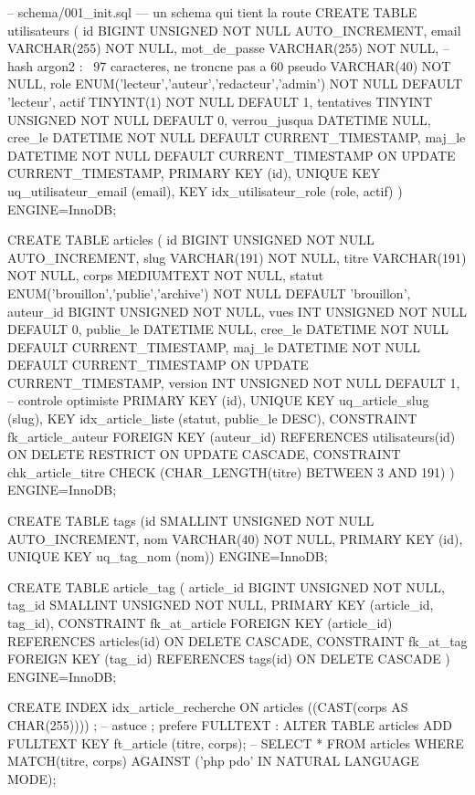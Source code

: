 \begin{codesql}
-- schema/001_init.sql --- un schema qui tient la route
CREATE TABLE utilisateurs (
  id            BIGINT UNSIGNED NOT NULL AUTO_INCREMENT,
  email         VARCHAR(255)    NOT NULL,
  mot_de_passe  VARCHAR(255)    NOT NULL,          -- hash argon2 : ~97 caracteres, ne troncne pas a 60
  pseudo        VARCHAR(40)     NOT NULL,
  role          ENUM('lecteur','auteur','redacteur','admin') NOT NULL DEFAULT 'lecteur',
  actif         TINYINT(1)      NOT NULL DEFAULT 1,
  tentatives    TINYINT UNSIGNED NOT NULL DEFAULT 0,
  verrou_jusqua DATETIME        NULL,
  cree_le       DATETIME        NOT NULL DEFAULT CURRENT_TIMESTAMP,
  maj_le        DATETIME        NOT NULL DEFAULT CURRENT_TIMESTAMP ON UPDATE CURRENT_TIMESTAMP,
  PRIMARY KEY (id),
  UNIQUE KEY uq_utilisateur_email (email),
  KEY idx_utilisateur_role (role, actif)
) ENGINE=InnoDB;

CREATE TABLE articles (
  id          BIGINT UNSIGNED NOT NULL AUTO_INCREMENT,
  slug        VARCHAR(191)    NOT NULL,
  titre       VARCHAR(191)    NOT NULL,
  corps       MEDIUMTEXT      NOT NULL,
  statut      ENUM('brouillon','publie','archive') NOT NULL DEFAULT 'brouillon',
  auteur_id   BIGINT UNSIGNED NOT NULL,
  vues        INT UNSIGNED    NOT NULL DEFAULT 0,
  publie_le   DATETIME        NULL,
  cree_le     DATETIME        NOT NULL DEFAULT CURRENT_TIMESTAMP,
  maj_le      DATETIME        NOT NULL DEFAULT CURRENT_TIMESTAMP ON UPDATE CURRENT_TIMESTAMP,
  version     INT UNSIGNED    NOT NULL DEFAULT 1,      -- controle optimiste
  PRIMARY KEY (id),
  UNIQUE KEY uq_article_slug (slug),
  KEY idx_article_liste (statut, publie_le DESC),
  CONSTRAINT fk_article_auteur FOREIGN KEY (auteur_id) REFERENCES utilisateurs(id)
    ON DELETE RESTRICT ON UPDATE CASCADE,
  CONSTRAINT chk_article_titre CHECK (CHAR_LENGTH(titre) BETWEEN 3 AND 191)
) ENGINE=InnoDB;

CREATE TABLE tags (id SMALLINT UNSIGNED NOT NULL AUTO_INCREMENT, nom VARCHAR(40) NOT NULL,
  PRIMARY KEY (id), UNIQUE KEY uq_tag_nom (nom)) ENGINE=InnoDB;

CREATE TABLE article_tag (
  article_id BIGINT UNSIGNED NOT NULL,
  tag_id     SMALLINT UNSIGNED NOT NULL,
  PRIMARY KEY (article_id, tag_id),
  CONSTRAINT fk_at_article FOREIGN KEY (article_id) REFERENCES articles(id) ON DELETE CASCADE,
  CONSTRAINT fk_at_tag     FOREIGN KEY (tag_id)     REFERENCES tags(id)     ON DELETE CASCADE
) ENGINE=InnoDB;

CREATE INDEX idx_article_recherche ON articles ((CAST(corps AS CHAR(255)))) ;  -- astuce ; prefere FULLTEXT :
ALTER TABLE articles ADD FULLTEXT KEY ft_article (titre, corps);
-- SELECT * FROM articles WHERE MATCH(titre, corps) AGAINST ('php pdo' IN NATURAL LANGUAGE MODE);
\end{codesql}

